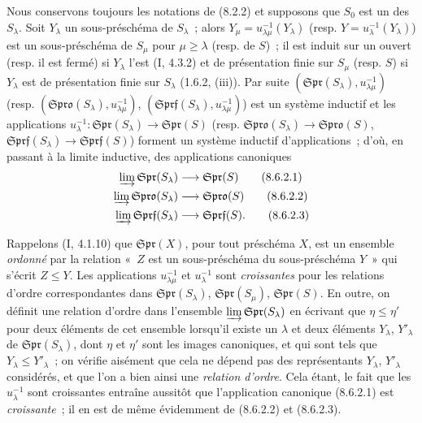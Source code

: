 \begin{env}[8.6.2]
\label{IV.8.6.2-fr}
Nous conservons toujours les notations de (8.2.2) et supposons que $S_0$ est
un des $S_\lambda$. Soit $Y_\lambda$ un sous-préschéma de $S_\lambda$~; alors
$Y_\mu=u_{\lambda\mu}^{-1}(Y_\lambda)$ (resp.
$Y=u_\lambda^{-1}(Y_\lambda)$) est un sous-préschéma de $S_\mu$ pour
$\mu\geq\lambda$ (resp. de $S$)~; il est induit sur un ouvert (resp. il est
fermé) si $Y_\lambda$ l'est (I, 4.3.2) et de présentation finie sur $S_\mu$
(resp. $S$) si $Y_\lambda$ est de présentation finie sur $S_\lambda$
(1.6.2, (iii)). Par suite
$(\mathfrak{Spr}(S_\lambda),u_{\lambda\mu}^{-1})$ (resp.
$(\mathfrak{Spro}(S_\lambda),u_{\lambda\mu}^{-1})$,
$(\mathfrak{Sprf}(S_\lambda),u_{\lambda\mu}^{-1})$) est un système inductif et
les applications
$u_\lambda^{-1}:\mathfrak{Spr}(S_\lambda)\to\mathfrak{Spr}(S)$ (resp.
$\mathfrak{Spro}(S_\lambda)\to\mathfrak{Spro}(S)$,
$\mathfrak{Sprf}(S_\lambda)\to\mathfrak{Sprf}(S)$) forment un système inductif
d'applications~; d'où, en passant à la limite inductive, des applications
canoniques
\begin{align}
  \varinjlim\mathfrak{Spr}(S_\lambda)
    &\longrightarrow\mathfrak{Spr}(S)
    \tag{8.6.2.1}\label{IV.8.6.2.1-fr}\\
  \varinjlim\mathfrak{Spro}(S_\lambda)
    &\longrightarrow\mathfrak{Spro}(S)
    \tag{8.6.2.2}\label{IV.8.6.2.2-fr}\\
  \varinjlim\mathfrak{Sprf}(S_\lambda)
    &\longrightarrow\mathfrak{Sprf}(S).
    \tag{8.6.2.3}\label{IV.8.6.2.3-fr}
\end{align}
\end{env}


Rappelons (I, 4.1.10) que $\mathfrak{Spr}(X)$, pour tout préschéma $X$, est un
ensemble \emph{ordonné} par la relation «~$Z$ est un sous-préschéma du
sous-préschéma $Y$~» qui s'écrit $Z\leq Y$. Les applications
$u_{\lambda\mu}^{-1}$ et $u_\lambda^{-1}$ sont \emph{croissantes} pour les
relations d'ordre correspondantes dans $\mathfrak{Spr}(S_\lambda)$,
$\mathfrak{Spr}(S_\mu)$, $\mathfrak{Spr}(S)$. En outre, on définit une relation
d'ordre dans l'ensemble $\varinjlim\mathfrak{Spr}(S_\lambda)$ en écrivant que
$\eta\leq\eta'$ pour deux éléments de cet ensemble lorsqu'il existe un
$\lambda$ et deux éléments $Y_\lambda$, $Y'_\lambda$ de
$\mathfrak{Spr}(S_\lambda)$, dont $\eta$ et $\eta'$ sont les images canoniques,
et qui sont tels que $Y_\lambda\leq Y'_\lambda$~; on vérifie aisément que cela
ne dépend pas des représentants $Y_\lambda$, $Y'_\lambda$ considérés, et que
l'on a bien ainsi une \emph{relation d'ordre}. Cela étant, le fait que les
$u_\lambda^{-1}$ sont croissantes entraîne aussitôt que l'application
canonique (8.6.2.1) est \emph{croissante}~; il en est de même évidemment de
(8.6.2.2) et (8.6.2.3).

